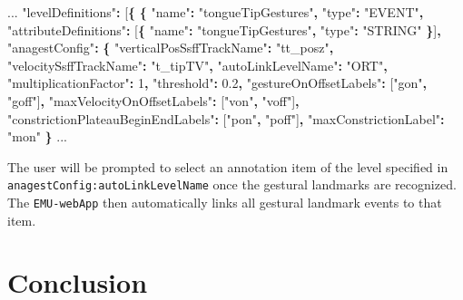\documentclass[]{book}
\newenvironment{Shaded}{\begin{snugshade}}{\end{snugshade}}
\newcommand{\DecValTok}[1]{\textcolor[rgb]{0.00,0.00,0.81}{#1}}
\newcommand{\FloatTok}[1]{\textcolor[rgb]{0.00,0.00,0.81}{#1}}
\newcommand{\NormalTok}[1]{#1}
\newcommand{\OperatorTok}[1]{\textcolor[rgb]{0.81,0.36,0.00}{\textbf{#1}}}
\newcommand{\StringTok}[1]{\textcolor[rgb]{0.31,0.60,0.02}{#1}}
\begin{document}
\begin{Shaded}
\begin{Highlighting}[]
\NormalTok{...}
\StringTok{"levelDefinitions"}\OperatorTok{:}\NormalTok{ [}\OperatorTok{\{}
  \OperatorTok{\{}
    \StringTok{"name"}\OperatorTok{:} \StringTok{"tongueTipGestures"}\OperatorTok{,}
    \StringTok{"type"}\OperatorTok{:} \StringTok{"EVENT"}\OperatorTok{,}
    \StringTok{"attributeDefinitions"}\OperatorTok{:}\NormalTok{ [}\OperatorTok{\{}
        \StringTok{"name"}\OperatorTok{:} \StringTok{"tongueTipGestures"}\OperatorTok{,}
        \StringTok{"type"}\OperatorTok{:} \StringTok{"STRING"}
    \OperatorTok{\}}\NormalTok{]}\OperatorTok{,}
    \StringTok{"anagestConfig"}\OperatorTok{:} \OperatorTok{\{}
        \StringTok{"verticalPosSsffTrackName"}\OperatorTok{:} \StringTok{"tt_posz"}\OperatorTok{,}
        \StringTok{"velocitySsffTrackName"}\OperatorTok{:} \StringTok{"t_tipTV"}\OperatorTok{,}
        \StringTok{"autoLinkLevelName"}\OperatorTok{:} \StringTok{"ORT"}\OperatorTok{,}
        \StringTok{"multiplicationFactor"}\OperatorTok{:} \DecValTok{1}\OperatorTok{,}
        \StringTok{"threshold"}\OperatorTok{:} \FloatTok{0.2}\OperatorTok{,}
        \StringTok{"gestureOnOffsetLabels"}\OperatorTok{:}\NormalTok{ [}\StringTok{"gon"}\OperatorTok{,} \StringTok{"goff"}\NormalTok{]}\OperatorTok{,}
        \StringTok{"maxVelocityOnOffsetLabels"}\OperatorTok{:}\NormalTok{ [}\StringTok{"von"}\OperatorTok{,} \StringTok{"voff"}\NormalTok{]}\OperatorTok{,}
        \StringTok{"constrictionPlateauBeginEndLabels"}\OperatorTok{:}\NormalTok{ [}\StringTok{"pon"}\OperatorTok{,} \StringTok{"poff"}\NormalTok{]}\OperatorTok{,}
        \StringTok{"maxConstrictionLabel"}\OperatorTok{:} \StringTok{"mon"}
    \OperatorTok{\}}
\NormalTok{...}
\end{Highlighting}
\end{Shaded}

The user will be prompted to select an annotation item of the level specified in \texttt{anagestConfig:autoLinkLevelName} once the gestural landmarks are recognized. The \texttt{EMU-webApp} then automatically links all gestural landmark events to that item.

\hypertarget{conclusion-5}{%
\section{Conclusion}\label{conclusion-5}}
\end{document}
